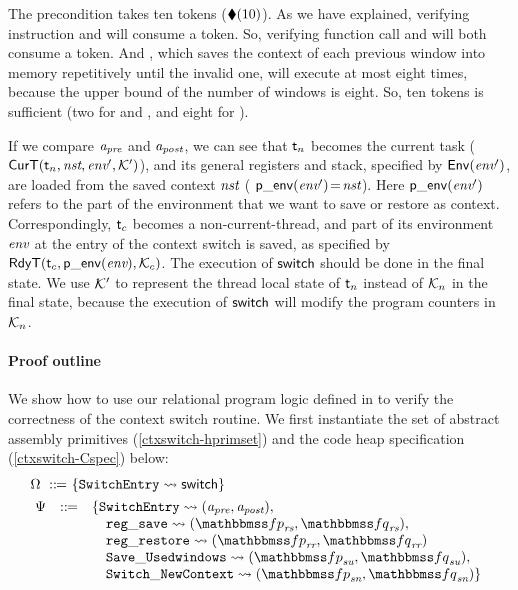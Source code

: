 The precondition takes ten tokens ($\blacklozenge({10})$).
As we have explained, verifying instruction \call{}
and \jmp{} will consume a token.
So, verifying function call
\regsave{} and \regrestore{} will
both consume a token. And \SaveUsedWin{},
which saves the context of each previous window
into memory repetitively until the invalid one,
will execute at most eight times,
because the upper bound of
the number of windows is eight.
So, ten tokens is sufficient (two for \regsave{} and
\regrestore{}, and eight for \SaveUsedWin{}).

If we compare $\textit{a}_\textit{pre}$ and $\textit{a}_\textit{post}$, we can see that
$\textsf{t}_n$ becomes the current task
($\textsf{CurT}({\textsf{t}_n}, {\textit{nst}}, {\textit{env}'}, {\mathcal{K}'})$),
and its general registers and stack, specified by
$\mathsf{Env}({\textit{env}'})$, are loaded from the saved context
$\textit{nst}$ (\ie{} $\mathsf{p\_env}({\textit{env}'})\!=\!\textit{nst}$).
Here $\mathsf{p\_env}({\textit{env}'})$ refers to the part of the environment
that we want to save or restore as context.
Correspondingly, $\textsf{t}_c$ becomes a non-current-thread,
and part of its environment $\textit{env}$ at the entry of
the context switch is saved, as specified by
$\textsf{RdyT}({\textsf{t}_c}, {\mathsf{p\_env}({\textit{env}})}, {\mathcal{K}_c})$.
The execution of $\mathsf{switch}$ should be done in the final state.
We use $\mathcal{K}'$ to represent the thread local
state of $\textsf{t}_n$ instead of $\mathcal{K}_n$
in the final state, because the execution of
$\mathsf{switch}$ will modify the program counters
in $\mathcal{K}_n$.

\paragraph{\textbf{Proof outline}} We show how to use
our relational program logic defined in
\Fig{\ref{fig:Selected Inference Rules for Refinement Verification}}
to verify the correctness of the context switch routine.
We first instantiate the set of
abstract assembly primitives (\ref{ctxswitch-hprimset})
and the code heap specification (\ref{ctxswitch-Cspec})
below:
\begin{align}
    & \hprimset \ \define \ \{ \SwitchEntry \leadsto
        \primsw \}
        \label{ctxswitch-hprimset} \\
    & \!\begin{array}{lcl}
        \Cspec & \define &
        \{ \SwitchEntry \leadsto (\Apre, \Apost), \\
        & & \quad
        \regsave \leadsto
        (\relspecpre_{\textit{rs}}, \relspecpost_{\textit{rs}}),\\
        & & \quad
        \regrestore \leadsto
        (\relspecpre_{\textit{rr}}, \relspecpost_{\textit{rr}}) \\
        & & \quad
        \SaveUsedWin{} \leadsto (\relspecpre_{\textit{su}}, \relspecpost_{\textit{su}}), \\
        & & \quad
        \SwitchNewTask{} \leadsto (\relspecpre_{\textit{sn}}, \relspecpost_{\textit{sn}})
        \}
        \label{ctxswitch-Cspec}
    \end{array}
\end{align}

